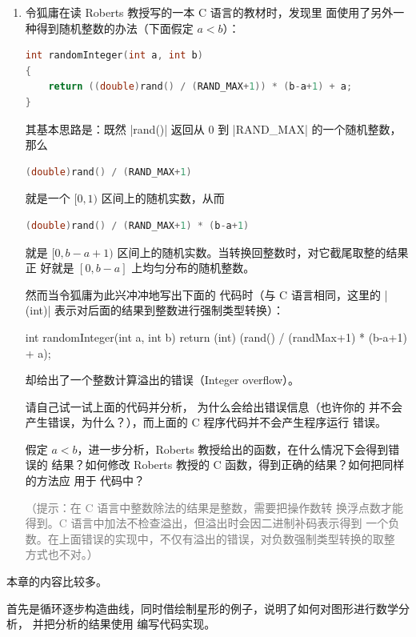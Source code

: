 \begin{enumerate}
  \item\label{ex:randint} 令狐庸在读 Roberts 教授写的一本 C 语言的教材时，发现里
    面使用了另外一种得到随机整数的办法（下面假定 $a<b$）：
\begin{lstlisting}[language=C,backgroundcolor={\color{green!20!lightgray}}]
int randomInteger(int a, int b)
{
    return ((double)rand() / (RAND_MAX+1)) * (b-a+1) + a;
}
\end{lstlisting}
    其基本思路是：既然 |rand()| 返回从 0 到 |RAND_MAX| 的一个随机整数，那么
\begin{lstlisting}[language=C,backgroundcolor={\color{green!20!lightgray}}]
(double)rand() / (RAND_MAX+1)
\end{lstlisting}
    就是一个 $[0,1)$ 区间上的随机实数，从而
\begin{lstlisting}[language=C,backgroundcolor={\color{green!20!lightgray}}]
(double)rand() / (RAND_MAX+1) * (b-a+1)
\end{lstlisting}
    就是 $[0, b-a+1)$ 区间上的随机实数。当转换回整数时，对它截尾取整的结果正
    好就是 $[0,b-a]$ 上均匀分布的随机整数。

    然而当令狐庸为此兴冲冲地写出下面的 \Asy{} 代码时（与 C 语言相同，这里的
    |(int)| 表示对后面的结果到整数进行强制类型转换）：
\begin{asycode}
int randomInteger(int a, int b)
{
    return (int) (rand() / (randMax+1) * (b-a+1) + a);
}
\end{asycode}
    \Asy{} 却给出了一个整数计算溢出的错误（Integer overflow）。

    请自己试一试上面的代码并分析，\Asy{} 为什么会给出错误信息（也许你的
    \Asy{} 并不会产生错误，为什么？），而上面的 C 程序代码并不会产生程序运行
    错误。

    假定 $a<b$，进一步分析，Roberts 教授给出的函数，在什么情况下会得到错误的
    结果？如何修改 Roberts 教授的 C 函数，得到正确的结果？如何把同样的方法应
    用于 \Asy{} 代码中？

    \textcolor{gray}{（提示：在 C 语言中整数除法的结果是整数，需要把操作数转
    换浮点数才能得到。C 语言中加法不检查溢出，但溢出时会因二进制补码表示得到
    一个负数。在上面错误的实现中，不仅有溢出的错误，对负数强制类型转换的取整
    方式也不对。）}

\end{enumerate}%

本章的内容比较多。

首先是循环逐步构造曲线，同时借绘制星形的例子，说明了如何对图形进行数学分析，
并把分析的结果使用 \Asy{} 编写代码实现。

